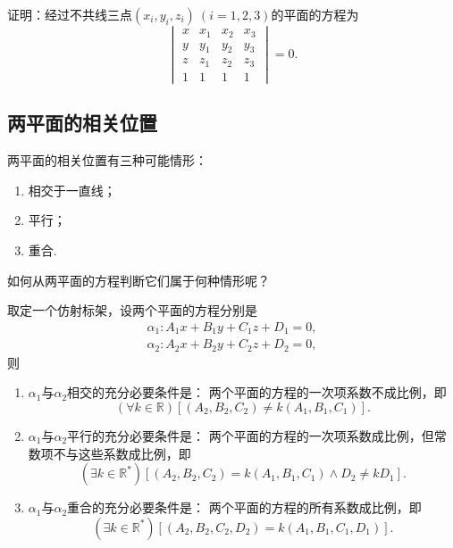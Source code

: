 \begin{example}
证明：经过不共线三点\((x_i,y_i,z_i)\ (i=1,2,3)\)的平面的方程为\begin{equation*}
	\begin{vmatrix}
		x & x_1 & x_2 & x_3 \\
		y & y_1 & y_2 & y_3 \\
		z & z_1 & z_2 & z_3 \\
		1 & 1 & 1 & 1
	\end{vmatrix} = 0.
\end{equation*}
\end{example}

\subsection{两平面的相关位置}
两平面的相关位置有三种可能情形：
\begin{enumerate}
	\item 相交于一直线；
	\item 平行；
	\item 重合.
\end{enumerate}
如何从两平面的方程判断它们属于何种情形呢？

\begin{theorem}
取定一个仿射标架，设两个平面的方程分别是\begin{equation*}
	\begin{split}
		\alpha_1: A_1 x + B_1 y + C_1 z + D_1 = 0, \\
		\alpha_2: A_2 x + B_2 y + C_2 z + D_2 = 0,
	\end{split}
\end{equation*}
则\begin{enumerate}
	\item \(\alpha_1\)与\(\alpha_2\)相交的充分必要条件是：
	两个平面的方程的一次项系数不成比例，即\begin{equation*}
		(\forall k \in \mathbb{R})
		[(A_2,B_2,C_2) \neq k (A_1,B_1,C_1)].
	\end{equation*}
	\item \(\alpha_1\)与\(\alpha_2\)平行的充分必要条件是：
	两个平面的方程的一次项系数成比例，但常数项不与这些系数成比例，即\begin{equation*}
		(\exists k \in \mathbb{R}^*)
		[(A_2,B_2,C_2) = k (A_1,B_1,C_1)
		\land D_2 \neq k D_1].
	\end{equation*}
	\item \(\alpha_1\)与\(\alpha_2\)重合的充分必要条件是：
	两个平面的方程的所有系数成比例，即\begin{equation*}
		(\exists k \in \mathbb{R}^*)
		[(A_2,B_2,C_2,D_2) = k (A_1,B_1,C_1,D_1)].
	\end{equation*}
\end{enumerate}
\end{theorem}

